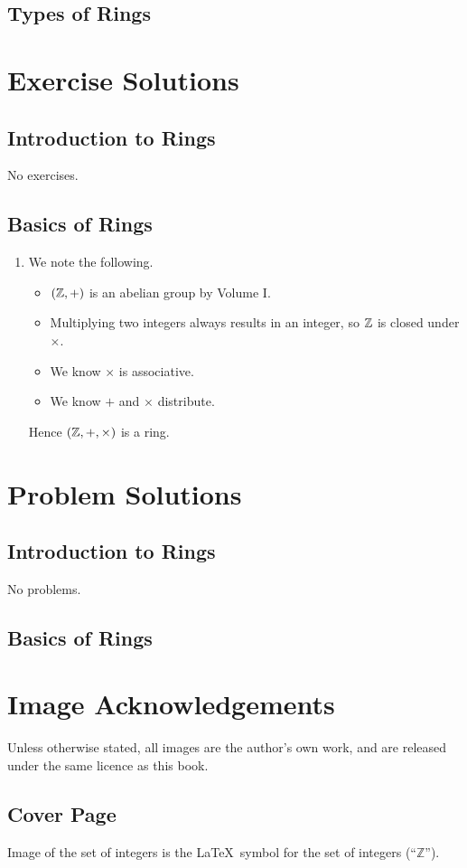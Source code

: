 \section{Types of Rings}

\appendix
\chapter{Exercise Solutions}
\section{Introduction to Rings}
No exercises.

\section{Basics of Rings}
\begin{enumerate}
    \item We note the following.
    \begin{itemize}
        \item $(\mathbb{Z}, +)$ is an abelian group by Volume I.
        \item Multiplying two integers always results in an integer, so $\mathbb{Z}$ is closed under $\times$.
        \item We know $\times$ is associative.
        \item We know $+$ and $\times$ distribute.
    \end{itemize}
    Hence $(\mathbb{Z}, +, \times)$ is a ring.
\end{enumerate}

\chapter{Problem Solutions}
\section{Introduction to Rings}
No problems.

\section{Basics of Rings}

\chapter{Image Acknowledgements}
Unless otherwise stated, all images are the author's own work, and are released under the same licence as this book.

\section{Cover Page}
Image of the set of integers is the \LaTeX\, symbol for the set of integers (``$\mathbb{Z}$'').

\printbibliography[heading=bibintoc, title={References and Bibliography}]
\printindex


